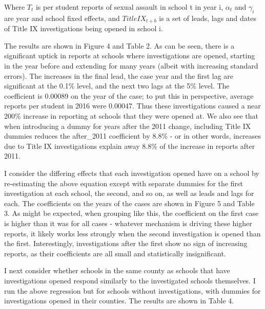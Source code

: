 \documentclass[AER]{AEA}
\begin{document}
Where $T_{t}$ is per student reports of sexual assault in school t in year i, $\alpha_{t}$ and $\gamma_{i}$ are year and school fixed effects, and $TitleIX_{t+b}$ is a set of leads, lags and dates of Title IX investigations being opened in school i. 

The results are shown in Figure 4 and Table 2. As can be seen, there is a significant uptick in reports at schools where investigations are opened, starting in the year before and extending for many years (albeit with increasing standard errors). The increases in the final lead, the case year and the first lag are significant at the 0.1\% level, and the next two lags at the 5\% level. The coefficient is 0.00089 on the year of the case; to put this in perspective, average reports per student in 2016 were 0.00047. Thus these investigations caused a near 200\% increase in reporting at schools that they were opened at. We also see that when introducing a dummy for years after the 2011 change, including Title IX dummies reduces the after\_2011 coefficient by 8.8\% - or in other words, increases due to Title IX investigations explain away 8.8\% of the increase in reports after 2011.

I consider the differing effects that each investigation opened have on a school by re-estimating the above equation except with separate dummies for the first investigation at each school, the second, and so on, as well as leads and lags for each. The coefficients on the years of the cases are shown in Figure 5 and Table 3. As might be expected, when grouping like this, the coefficient on the first case is higher than it was for all cases - whatever mechanism is driving these higher reports, it likely works less strongly when the second investigation is opened than the first. Interestingly, investigations after the first show no sign of increasing reports, as their coefficients are all small and statistically insignificant. 

I next consider whether schools in the same county as schools that have investigations opened respond similarly to the investigated schools themselves. I run the above regression but for schools without investigations, with dummies for investigations opened in their counties. The results are shown in Table 4. 
\end{document}
